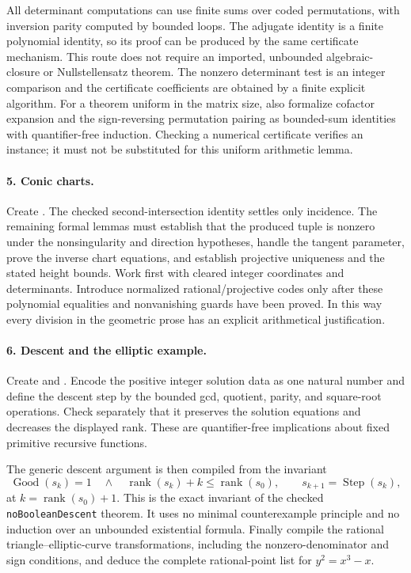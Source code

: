 All determinant computations can use finite sums over coded
permutations, with inversion parity computed by bounded loops.
The adjugate identity is a finite polynomial identity, so its proof can
be produced by the same certificate mechanism.  This route does not
require an imported, unbounded algebraic-closure or Nullstellensatz
theorem.  The nonzero determinant test is an integer comparison and the
certificate coefficients are obtained by a finite explicit algorithm.
For a theorem uniform in the matrix size, also formalize cofactor expansion
and the sign-reversing permutation pairing as bounded-sum identities with
quantifier-free induction. Checking a numerical certificate verifies an
instance; it must not be substituted for this uniform arithmetic lemma.

\paragraph{5. Conic charts.}
Create .  The checked second-intersection identity
settles only incidence.  The remaining formal lemmas must establish that
the produced tuple is nonzero under the nonsingularity and direction
hypotheses, handle the tangent parameter, prove the inverse chart
equations, and establish projective uniqueness and the stated height
bounds.  Work first with cleared integer coordinates and determinants.
Introduce normalized rational/projective codes only after these
polynomial equalities and nonvanishing guards have been proved.
In this way every division in the geometric prose has an explicit
arithmetical justification.

\paragraph{6. Descent and the elliptic example.}
Create  and
. Encode the positive integer solution
data as one natural number and define the descent step by the bounded
gcd, quotient, parity, and square-root operations.  Check separately
that it preserves the solution equations and decreases the displayed
rank.  These are quantifier-free implications about fixed primitive
recursive functions.

The generic descent argument is then compiled from the invariant
\[
 \operatorname{Good}(s_k)=1\quad\wedge\quad
 \operatorname{rank}(s_k)+k\leq\operatorname{rank}(s_0),
 \qquad s_{k+1}=\operatorname{Step}(s_k),
\]
at $k=\operatorname{rank}(s_0)+1$.  This is the exact invariant of the
checked \texttt{noBooleanDescent} theorem.  It uses no minimal
counterexample principle and no induction over an unbounded existential
formula.  Finally compile the rational triangle--elliptic-curve
transformations, including the nonzero-denominator and sign conditions,
and deduce the complete rational-point list for $y^2=x^3-x$.

